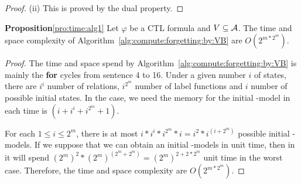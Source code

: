\documentclass{article}
\begin{document}
\begin{proof}
(ii) This is proved by the dual property.
\end{proof}



\textbf{Proposition}\ref{pro:time:alg1} Let $\varphi$ be a CTL formula and $V\subseteq {\cal A}$. The time and space complexity of
Algorithm~\ref{alg:compute:forgetting:by:VB} are $O(2^{m*2^m})$.\\
\begin{proof}
The time and space spend by Algorithm~\ref{alg:compute:forgetting:by:VB} is mainly the \textbf{for} cycles from sentence 4 to 16.
Under a given number $i$ of states, there are $i^i$ number of relations, $i^{2^m}$ number of label functions and $i$ number of possible initial states. In the case, we need the memory for the initial \MPK-model in each time is $(i+i^i+i^{2^m}+1)$.

For each $1\leq i \leq 2^m$, there is at most $i*i^i*i^{2^m}*i=i^2*i^{(i+2^m)}$ possible initial \MPK-models.
If we suppose that we can obtain an initial \MPK-models in unit time, then in it will spend $(2^m)^2*(2^m)^{(2^m+2^m)} = (2^m)^{2+2*2^m}$ unit time in the worst case. Therefore, the time and space complexity are $O(2^{m*2^m})$.
\end{proof}




\end{document}
